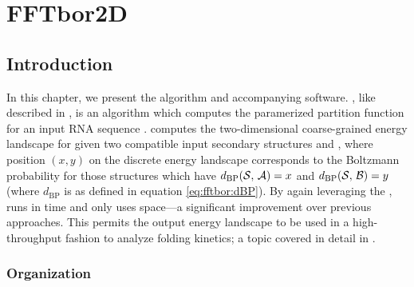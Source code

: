 \documentclass[11pt, oneside]{Thesis} %
\providecommand{\DIFaddbegin}{} %
\providecommand{\DIFaddend}{} %
\providecommand{\DIFdelbegin}{} %
\providecommand{\DIFdelend}{} %
\begin{document}

\chapter{FFTbor2D}
\label{ch:ffttwo}

\DIFdelbegin %
\DIFdelend \DIFaddbegin {}
\DIFaddend 

\section{Introduction}
\label{sec:ffttwo:intro}

In this chapter, we present the \ffttwo algorithm and accompanying software.
\ffttwo, like \fftbor described in , is an algorithm
which computes the paramerized partition function for an input RNA sequence
\seq. \ffttwo computes the two-dimensional coarse-grained energy landscape for \seq
given two compatible input secondary structures \strA and \strB, where position
$(x,y)$ on the discrete energy landscape corresponds to the Boltzmann
probability for those structures \str which have $d_{\text{BP}}(\mathcal S,\,\mathcal A)=x$ and
$d_{\text{BP}}(\mathcal S,\,\mathcal B)=y$ (where $d_{\text{BP}}$ is as defined in
equation \ref{eq:fftbor:dBP}). By again leveraging the \fft, \ffttwo runs in 
time and only uses  space---a significant improvement over previous
approaches. This permits the output energy landscape to be used in a
high-throughput fashion to analyze folding kinetics; a topic covered in detail
in .

\subsection{Organization}
\label{subsec:ffttwo:org}
\end{document}
